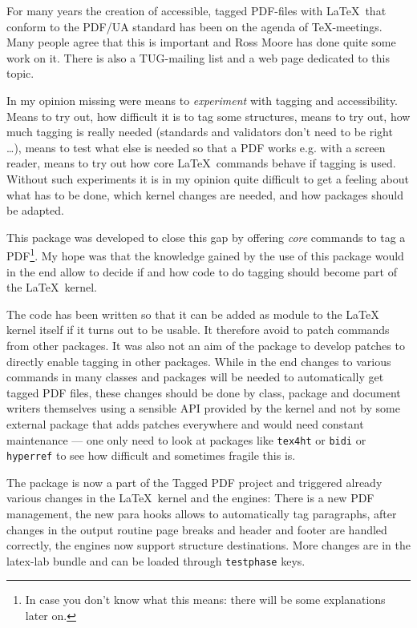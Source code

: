 \documentclass[bibliography=totoc,a4paper]{article}
\newcommand\pkg[1]{\texttt{#1}}
\newcommand\PDF{PDF}
\begin{document}
For many years the creation of accessible, tagged \PDF{}-files with \LaTeX\ 
that conform to the PDF/UA standard has been on the agenda of \TeX-meetings. 
Many people agree that this is important and Ross Moore has done quite some 
work on it. There is also a TUG-mailing list and a web page 
\parencite{tugaccess} dedicated to this topic. 

In my opinion missing were means to \emph{experiment} with tagging and 
accessibility. Means to try out, how difficult it is to tag some structures, 
means to try out, how much tagging is really needed (standards and validators 
don't need to be right \ldots), means to test what else is needed so that a 
\PDF{} works e.g. with a screen reader, means to try out how core \LaTeX\ 
commands behave if tagging is used. Without such experiments it is in my 
opinion quite difficult to get a feeling about what has to be done, which 
kernel changes are needed, and how packages should be adapted. 

This package was developed to close this gap by offering \emph{core} commands 
to tag a \PDF{}\footnote{In case you don't know what this means: there will 
be some explanations later on.}. My hope was that the knowledge gained by the 
use of this package would in the end allow to decide if and how code to do 
tagging should become part of the \LaTeX\ kernel. 


The code has been written so that it can be added as module to the \LaTeX{} 
kernel itself if it turns out to be usable. It therefore avoid to patch 
commands from other packages. It was also not an aim of the package to 
develop patches to directly enable tagging in other packages. While in the end changes to various commands in many 
classes and packages will be needed to automatically get tagged \PDF{} files, these changes 
should be done by class, package and document writers themselves using a 
sensible API provided by the kernel and not by some external package that 
adds patches everywhere and would need constant maintenance --- one only need 
to look at packages like \pkg{tex4ht} or \pkg{bidi} or \pkg{hyperref} to see how difficult and 
sometimes fragile this is. 

The package is now a part of the Tagged PDF project and triggered already 
various changes in the \LaTeX\ kernel and the engines: There is a new PDF 
management, the new para hooks allows to automatically tag paragraphs, after 
changes in the output routine page breaks and header and footer are handled 
correctly, the engines now support structure destinations. More changes are 
in the latex-lab bundle and can be loaded through \texttt{testphase} keys. 
\end{document}
